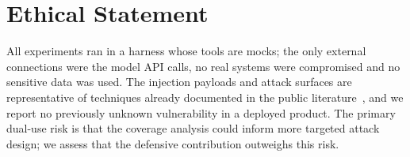 \documentclass[letterpaper]{article} %
\begin{document}
\section*{Ethical Statement}

All experiments ran in a harness whose tools are mocks; the only external
connections were the model API calls, no real systems were compromised and
no sensitive data was used.
The injection payloads and attack surfaces are representative of
techniques already documented in the public
literature~\cite{greshake2023not,perez2022ignore}, and we report no
previously unknown vulnerability in a deployed product.
The primary dual-use risk is that the coverage analysis could inform
more targeted attack design; we assess that the defensive contribution
outweighs this risk.


\end{document}
